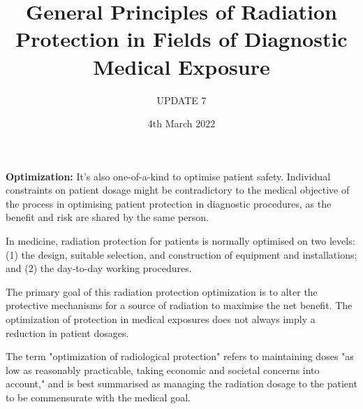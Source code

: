 \documentclass[12pt]{article}
\title{General Principles of Radiation Protection in Fields of Diagnostic Medical Exposure}
\author{UPDATE 7}
\date{4th March 2022}
\begin{document}
\maketitle

\textbf{Optimization:}
It's also one-of-a-kind to optimise patient safety. Individual constraints on patient dosage might be contradictory to the medical objective of the process in optimising patient protection in diagnostic procedures, as the benefit and risk are shared by the same person. 

In medicine, radiation protection for patients is normally optimised on two levels: 
(1) the design, suitable selection, and construction of equipment and installations; and (2) the day-to-day working procedures. 

\raggedright The primary goal of this radiation protection optimization is to alter the protective mechanisms for a source of radiation to maximise the net benefit. The optimization of protection in medical exposures does not always imply a reduction in patient dosages.

The term "optimization of radiological protection" refers to maintaining doses "as low as reasonably practicable, taking economic and societal concerns into account," and is best summarised as managing the radiation dosage to the patient to be commensurate with the medical goal.
\end{document}
